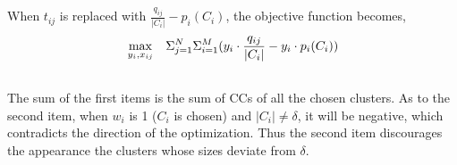 \documentclass[times]{ettauth}
\theoremstyle{mytheoremstyle}
\theoremstyle{mytheoremstyle}
\theoremstyle{mytheoremstyle}
\begin{document}

When $t_{ij}$ is replaced with $\frac{q_{ij}}{|C_i|} - p_i(C_i)$, the objective function becomes,
\begin{equation}
\begin{aligned}
     &\max\limits_{y_i, x_{ij}} && \Sigma_{j=1}^N\Sigma_{i=1}^M (y_i\cdot \frac{q_{ij}}{|C_i|} - y_i\cdot p_i(C_i)) \\
\notag
\end{aligned}
\label{centralized_opt}
\end{equation}
The sum of the first items is the sum of CCs of all the chosen clusters.
As to the second item, when $w_i$ is 1 ($C_i$ is chosen) and $|C_i|\neq\delta$, it will be negative, which contradicts the direction of the optimization.
Thus the second item discourages the appearance the clusters whose sizes deviate from $\delta$.

\end{document}
